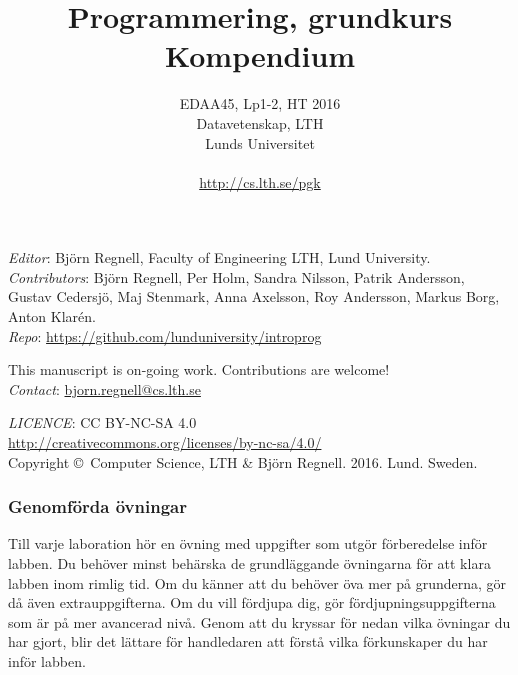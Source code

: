 \documentclass[a4paper]{compendium}
\title{
{\bf\Huge\sffamily  Programmering, grundkurs} 
\\ \vspace{2em}
{\sffamily  Kompendium}
}
\date{EDAA45, Lp1-2, HT 2016 \\ 
Datavetenskap, LTH \\ 
Lunds Universitet  \\~\\
\url{http://cs.lth.se/pgk}}
\begin{document}
\maketitle

\clearpage\null\thispagestyle{empty}
\vfill

{\setlength{\parindent}{0pt}
\emph{Editor}: Björn Regnell, Faculty of Engineering LTH, Lund University. \\ 

\emph{Contributors}: 
Björn Regnell,
Per Holm,
Sandra Nilsson,
Patrik Andersson,
Gustav Cedersjö,
Maj Stenmark,
Anna Axelsson,
Roy Andersson,
Markus Borg,
Anton Klarén.
\\

\emph{Repo}: \url{https://github.com/lunduniversity/introprog} \\ \newline

This manuscript is on-going work. Contributions are welcome! \\ 
\emph{Contact}: \url{bjorn.regnell@cs.lth.se}
\\ \newline

\emph{LICENCE}: CC BY-NC-SA 4.0 \\
\url{http://creativecommons.org/licenses/by-nc-sa/4.0/}
\\ \newline
Copyright \copyright~Computer Science, LTH \& Björn Regnell. 2016. Lund. Sweden.\\

}



\subsubsection*{Genomförda övningar}

\vspace{1em}\noindent 
{Till varje laboration hör en övning med uppgifter som utgör förberedelse inför labben. Du behöver minst behärska de grundläggande övningarna för att klara labben inom rimlig tid. Om du känner att du behöver öva mer på grunderna, gör då även extrauppgifterna. Om du vill fördjupa dig, gör fördjupningsuppgifterna som är på mer avancerad nivå. Genom att du kryssar för nedan vilka övningar du har gjort, blir det lättare för handledaren att förstå vilka förkunskaper du har inför labben.}

\newcommand{\TickBox}{\raisebox{-.50ex}{\Large$\square$}}
\newcommand{\ExeRow}[1]{\texttt{#1} & \TickBox  &  \TickBox &  \TickBox  \\ \addlinespace }
\end{document}
